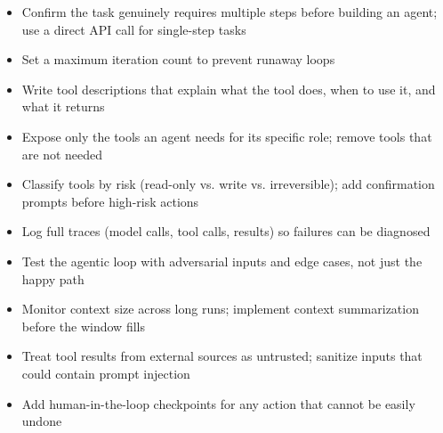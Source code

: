 \begin{itemize}[noitemsep,topsep=0pt]
  \item Confirm the task genuinely requires multiple steps before building an agent; use a direct API call for single-step tasks
  \item Set a maximum iteration count to prevent runaway loops
  \item Write tool descriptions that explain what the tool does, when to use it, and what it returns
  \item Expose only the tools an agent needs for its specific role; remove tools that are not needed
  \item Classify tools by risk (read-only vs. write vs. irreversible); add confirmation prompts before high-risk actions
  \item Log full traces (model calls, tool calls, results) so failures can be diagnosed
  \item Test the agentic loop with adversarial inputs and edge cases, not just the happy path
  \item Monitor context size across long runs; implement context summarization before the window fills
  \item Treat tool results from external sources as untrusted; sanitize inputs that could contain prompt injection
  \item Add human-in-the-loop checkpoints for any action that cannot be easily undone
\end{itemize}
